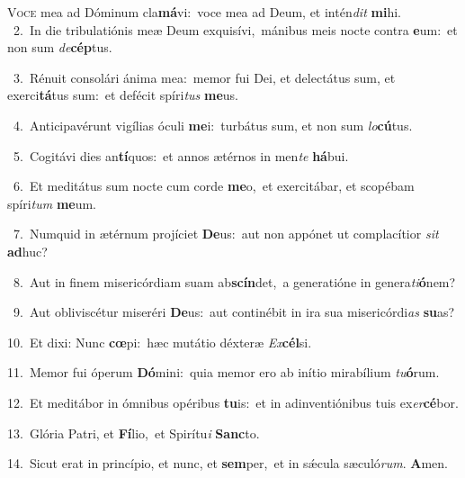 \lettrine{\initial\textcolor{\initialcolor}{V}}{oce} mea ad Dóminum cla\-\textbf{má}\-vi:~\star voce mea ad Deum, et intén\textit{dit} \textbf{mi}\-hi.\\
{\numbfont\textcolor{\numbcolor}{~2.}}~In die tribulatiónis meæ Deum exquisívi,~\dagger mánibus meis nocte contra \textbf{e}\-um:~\star et non sum \textit{de}\-\textbf{cép}tus.\par
{\numbfont\textcolor{\numbcolor}{~3.}}~Rénuit consolári ánima mea:~\dagger memor fui Dei, et delectátus sum, et exerci\-\textbf{tá}\-tus sum:~\star et defécit spíri\textit{tus} \textbf{me}\-us.\par
{\numbfont\textcolor{\numbcolor}{~4.}}~Anticipavérunt vigílias óculi \textbf{me}\-i:~\star turbátus sum, et non sum \textit{lo}\-\textbf{cú}tus.\par
{\numbfont\textcolor{\numbcolor}{~5.}}~Cogitávi dies an\-\textbf{tí}\-quos:~\star et annos ætérnos in men\textit{te} \textbf{há}\-bui.\par
{\numbfont\textcolor{\numbcolor}{~6.}}~Et meditátus sum nocte cum corde \textbf{me}\-o,~\star et exercitábar, et scopébam spíri\textit{tum} \textbf{me}\-um.\par
{\numbfont\textcolor{\numbcolor}{~7.}}~Numquid in ætérnum projíciet \textbf{De}\-us:~\star aut non appónet ut complacítior \textit{sit} \textbf{ad}\-huc?\par
{\numbfont\textcolor{\numbcolor}{~8.}}~Aut in finem misericórdiam suam ab\-\textbf{scín}\-det,~\star a generatióne in genera\-\textit{ti}\-\textbf{ó}nem?\par
{\numbfont\textcolor{\numbcolor}{~9.}}~Aut obliviscétur miseréri \textbf{De}\-us:~\star aut continébit in ira sua misericórdi\textit{as} \textbf{su}\-as?\par
{\numbfont\textcolor{\numbcolor}{10.}}~Et dixi: Nunc \textbf{cœ}\-pi:~\star hæc mutátio déxteræ \textit{Ex}\-\textbf{cél}si.\par
{\numbfont\textcolor{\numbcolor}{11.}}~Memor fui óperum \textbf{Dó}\-mini:~\star quia memor ero ab inítio mirabílium \textit{tu}\-\textbf{ó}rum.\par
{\numbfont\textcolor{\numbcolor}{12.}}~Et meditábor in ómnibus opéribus \textbf{tu}\-is:~\star et in adinventiónibus tuis ex\-\textit{er}\-\textbf{cé}bor.\par
{\numbfont\textcolor{\numbcolor}{13.}}~Glória Patri, et \textbf{Fí}\-lio,~\star et Spirítu\textit{i} \textbf{Sanc}\-to.\par
{\numbfont\textcolor{\numbcolor}{14.}}~Sicut erat in princípio, et nunc, et \textbf{sem}\-per,~\star et in sǽcula sæculó\-\textit{rum}\-. \textbf{A}\-men.\par
